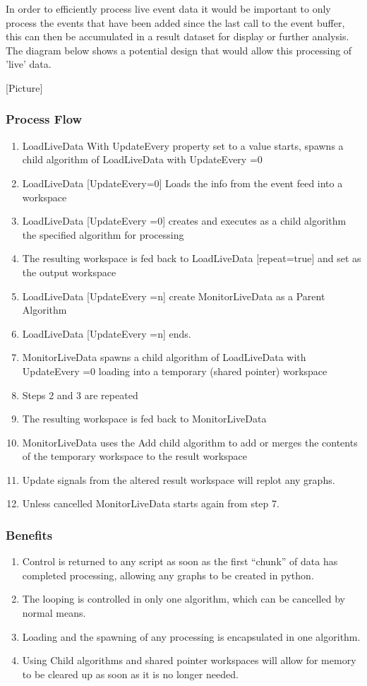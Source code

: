 In order to efficiently process live event data it would be important to only process the events that have been added since the last call to the event buffer, this can then be accumulated in a result dataset for display or further analysis. The diagram below shows a potential design that would allow this processing of 'live' data.

[Picture]

\subsubsection{Process Flow}
\begin{enumerate}
\item LoadLiveData With UpdateEvery property set to a value starts, spawns a child algorithm of LoadLiveData with UpdateEvery =0
\item LoadLiveData [UpdateEvery=0] Loads the info from the event feed into a workspace
\item LoadLiveData [UpdateEvery =0] creates and executes as a child algorithm the specified algorithm for processing
\item The resulting workspace is fed back to LoadLiveData [repeat=true] and set as the output workspace
\item LoadLiveData [UpdateEvery =n] create MonitorLiveData as a Parent Algorithm
\item LoadLiveData [UpdateEvery =n] ends.
\item MonitorLiveData  spawns a child algorithm of LoadLiveData with UpdateEvery =0 loading into a temporary (shared pointer) workspace
\item Steps 2 and 3 are repeated
\item The resulting workspace is fed back to MonitorLiveData
\item MonitorLiveData uses the Add child algorithm to add or merges the contents of the temporary workspace to the result workspace
\item Update signals from the altered result workspace will replot any graphs.
\item Unless cancelled MonitorLiveData starts again from step 7.
\end{enumerate}

\subsubsection{Benefits}
\begin{enumerate}
\item Control is returned to any script as soon as the first “chunk” of data has completed processing, allowing any graphs to be created in python.
\item The looping is controlled in only one algorithm, which can be cancelled by normal means.
\item Loading and the spawning of any processing is encapsulated in one algorithm.
\item Using Child algorithms and shared pointer workspaces will allow for memory to be cleared up as soon as it is no longer needed.
\end{enumerate}


